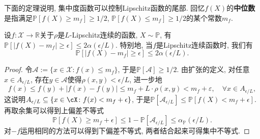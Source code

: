 下面的定理说明, 集中度函数可以控制Lipschitz函数的尾部. 
回忆$f(X)$的\textbf{中位数}是指满足$\mathbb{P}[f(X) \geq m_f] \geq 1/2$, $\mathbb{P}[f(X) \leq m_f] \geq 1/2$的某个常数$m_f$. 

\begin{theorem}[Lévy不等式]\label{thm:LévyIneq}
	设$f \colon \mathcal{X} \to \mathbb{R}$关于$\rho$是$L$-Lipschitz连续的函数, $X \sim \mathbb{P}$, 有$\mathbb{P}[ |f(X) - m_f| \geq \epsilon] \leq 2 \alpha(\epsilon / L)$. 
	特别地, 当$f$是Lipschitz连续函数时, 我们有
	\begin{equation*}
		\mathbb{P}[ |f(X) - m_f| \geq \epsilon] \leq 2 \alpha(\epsilon / L). 
	\end{equation*}
\end{theorem}
\begin{proof}
	令$\mathcal{A} := \{x \in \mathcal{X} \colon f(x) \leq m_f\}$, 于是$\mathbb{P}[\mathcal{A}] \geq 1/2$. 
	由扩张的定义, 对任意$x \in A_{\epsilon / L}$, 存在$y \in \mathcal{A}$使得$\rho(x, y) < \epsilon / L$, 进一步地
	\begin{equation*}
		f(x) 
		\leq f(y) + |f(x) - f(y)| 
		\leq m_f + L \cdot \rho(x, y)
		< m_f + \varepsilon, 
		\quad \forall x \in A_{\epsilon / L}, 
	\end{equation*}
	这说明$A_{\epsilon / L} \subseteq \{x \in \cX \colon f(x) < m_f + \epsilon\}$, 于是$\mathbb{P}[\mathcal{A}_{\epsilon / L}] \leq \mathbb{P}[f(X) < m_f + \epsilon]$. 
	再取余集可以得到上偏差不等式
	\begin{equation*}
		\mathbb{P}[f(X) \geq m_f + \epsilon] 
		\leq 1 - \mathbb{P}[\mathcal{A}_{\epsilon / L}] 
		\leq \alpha_{\mathbb{P}}(\epsilon / L). 
	\end{equation*}
	对$-f$运用相同的方法可以得到下偏差不等式, 两者结合起来可得集中不等式. 
\end{proof}

